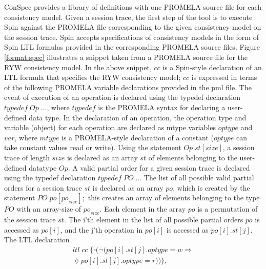 \documentclass[journal,compsoc]{IEEEtran}
\begin{document}
  \par ConSpec provides a library of definitions with one PROMELA source file for each consistency model. Given a session trace, the first step of the tool is to execute Spin against the PROMELA file corresponding to the given consistency model on the session trace. Spin accepts specifications of consistency models in the form of Spin LTL  formulas provided in the corresponding PROMELA source files.  Figure \ref{format:spec} illustrates a snippet taken from a  PROMELA  source file for the RYW consistency model. In the above snippet, $\mathit{cc}$ is a Spin-style declaration of an LTL formula that specifies the RYW consistency model; $\mathit{cc}$ is expressed in terms of the following PROMELA variable declarations provided in the pml file. The event of execution of an operation is declared using the typedef declaration  $\mathit{typedef}\; \mathit{Op}\; ...$, where $\mathit{typedef}$ is the PROMELA syntax for declaring a user-defined data type. In the declaration of an operation, the operation type and variable (object) for each operation are declared as  mtype variables $\mathit{optype}$ and $\mathit{var}$, where $\mathit{mtype} $ is a PROMELA-style declaration of a constant ($\mathit{optype}$ can take constant values read or write).  Using the statement $\mathit{Op} \; \mathit{st}[\mathit{size}]$, a session trace of length $\mathit{size}$ is declared as an array $\mathit{st} $ of elements belonging to the user-defined datatype $\mathit{Op}$.  A valid partial order for a given session trace is declared using the typedef declaration $\mathit{typedef}\; \mathit{PO}\; ...$  The list of all possible valid partial orders for a session trace $\mathit{st}$ is declared as an array $\mathit{po}$, which is created by the statement $\mathit{PO}\; \mathit{po}[\mathit{po}_\mathit{size}];$ this creates an array of elements belonging to the type $\mathit{PO}$ with an  array-size of $\mathit{po}_\mathit{size}$. Each element in the array $\mathit{po}$ is a permutation of the session trace $\mathit{st}$. The i'th element in the list of all possible partial orders $\mathit{po}$ is accessed as $\mathit{po}[i]$, and the j'th operation in $\mathit{po}[i]$ is accessed as $\mathit{po}[i].\mathit{st}[j]$. The LTL declaration 
  \begin{align*}%
 ltl \; \mathit{cc}  \; \{  \square ( \lnot (\mathit{po}[i].\mathit{st}[j].\mathit{optype} = w \Rightarrow \\ 
 \lozenge  \mathit{po}[i].\mathit{st}[j].\mathit{optype} = r)) \},
    \end{align*}
\end{document}
